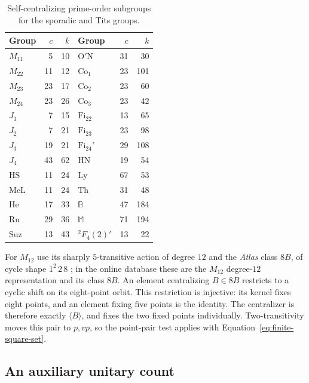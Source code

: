\begin{table}[htbp]
\centering
\small
\begin{tabular}{lrr@{\qquad}lrr}
\toprule
Group & $c$ & $k$ & Group & $c$ & $k$\\
\midrule
$M_{11}$ & 5 & 10 & $\mathrm{O'N}$ & 31 & 30\\
$M_{22}$ & 11 & 12 & $\mathrm{Co}_1$ & 23 & 101\\
$M_{23}$ & 23 & 17 & $\mathrm{Co}_2$ & 23 & 60\\
$M_{24}$ & 23 & 26 & $\mathrm{Co}_3$ & 23 & 42\\
$J_1$ & 7 & 15 & $\mathrm{Fi}_{22}$ & 13 & 65\\
$J_2$ & 7 & 21 & $\mathrm{Fi}_{23}$ & 23 & 98\\
$J_3$ & 19 & 21 & $\mathrm{Fi}_{24}'$ & 29 & 108\\
$J_4$ & 43 & 62 & $\mathrm{HN}$ & 19 & 54\\
$\mathrm{HS}$ & 11 & 24 & $\mathrm{Ly}$ & 67 & 53\\
$\mathrm{McL}$ & 11 & 24 & $\mathrm{Th}$ & 31 & 48\\
$\mathrm{He}$ & 17 & 33 & $\mathbb B$ & 47 & 184\\
$\mathrm{Ru}$ & 29 & 36 & $\mathbb M$ & 71 & 194\\
$\mathrm{Suz}$ & 13 & 43 & ${}^2F_4(2)'$ & 13 & 22\\
\bottomrule
\end{tabular}
\caption{Self-centralizing prime-order subgroups for the sporadic and
Tits groups.}\label{tab:finite-sporadic}
\end{table}

For $M_{12}$ use its sharply $5$-transitive action of degree $12$ and
the \emph{Atlas} class $8B$, of cycle shape $1^2\,2\,8$
\cite{Atlas,AtlasOnline}; in the online database these are the
$M_{12}$ degree-$12$ representation and its class $8B$.
An element centralizing $B\in8B$ restricts to a cyclic shift on its
eight-point orbit. This restriction is injective: its kernel fixes
eight points, and an element fixing five points is the identity.
The centralizer is therefore exactly $\langle B\rangle$, and fixes
the two fixed points individually. Two-transitivity moves this pair to
$p,vp$, so the point-pair test applies with
Equation~\eqref{eq:finite-square-set}.

\subsection{An auxiliary unitary count}

